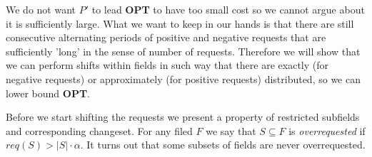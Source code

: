 We do not want $P'$ to lead \textbf{OPT} to have too small cost so we cannot 
argue about it is sufficiently large. What we want to keep in our hands is that 
there are still consecutive alternating periods of positive and negative 
requests that are sufficiently 'long' in the sense of number of requests. 
Therefore we will show that we can perform shifts within fields in such way 
that there are exactly (for negative requests) or approximately (for positive 
requests) distributed, so we can lower bound \textbf{OPT}.

Before we start shifting the requests we present a property of restricted 
subfields and corresponding changeset. For any filed $F$ we say that $S 
\subseteq F$ is \textit{overrequested} if $req(S) > |S| \cdot \alpha$. It turns 
out that some subsets of fields are never overrequested.

